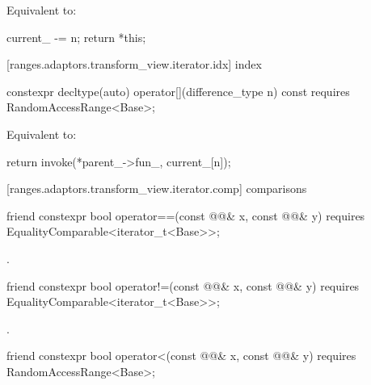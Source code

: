 \begin{itemdescr}
\pnum
\effects Equivalent to:
\begin{codeblock}
current_ -= n;
return *this;
\end{codeblock}
\end{itemdescr}

[ranges.adaptors.transform_view.iterator.idx]{ index}

\begin{itemdecl}
constexpr decltype(auto) operator[](difference_type n) const
requires RandomAccessRange<Base>;
\end{itemdecl}

\begin{itemdescr}
\pnum
\effects Equivalent to:
\begin{codeblock}
return invoke(*parent_->fun_, current_[n]);
\end{codeblock}
\end{itemdescr}

[ranges.adaptors.transform_view.iterator.comp]{ comparisons}

\begin{itemdecl}
friend constexpr bool operator==(const @@& x, const @@& y)
requires EqualityComparable<iterator_t<Base>>;
\end{itemdecl}

\begin{itemdescr}
\pnum
\returns {}.
\end{itemdescr}

%
\begin{itemdecl}
friend constexpr bool operator!=(const @@& x, const @@& y)
requires EqualityComparable<iterator_t<Base>>;
\end{itemdecl}

\begin{itemdescr}
\pnum
\returns {}.
\end{itemdescr}

%
\begin{itemdecl}
friend constexpr bool operator<(const @@& x, const @@& y)
requires RandomAccessRange<Base>;
\end{itemdecl}

